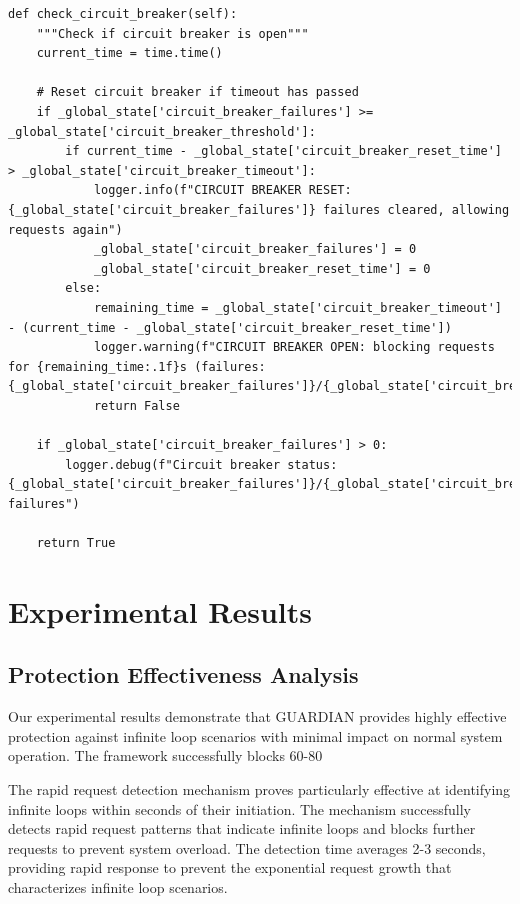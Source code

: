 \documentclass[10pt]{article}
\begin{document}
\begin{lstlisting}[caption={Intelligent Circuit Breaker Implementation}]
def check_circuit_breaker(self):
    """Check if circuit breaker is open"""
    current_time = time.time()
    
    # Reset circuit breaker if timeout has passed
    if _global_state['circuit_breaker_failures'] >= _global_state['circuit_breaker_threshold']:
        if current_time - _global_state['circuit_breaker_reset_time'] > _global_state['circuit_breaker_timeout']:
            logger.info(f"CIRCUIT BREAKER RESET: {_global_state['circuit_breaker_failures']} failures cleared, allowing requests again")
            _global_state['circuit_breaker_failures'] = 0
            _global_state['circuit_breaker_reset_time'] = 0
        else:
            remaining_time = _global_state['circuit_breaker_timeout'] - (current_time - _global_state['circuit_breaker_reset_time'])
            logger.warning(f"CIRCUIT BREAKER OPEN: blocking requests for {remaining_time:.1f}s (failures: {_global_state['circuit_breaker_failures']}/{_global_state['circuit_breaker_threshold']})")
            return False
    
    if _global_state['circuit_breaker_failures'] > 0:
        logger.debug(f"Circuit breaker status: {_global_state['circuit_breaker_failures']}/{_global_state['circuit_breaker_threshold']} failures")
    
    return True
\end{lstlisting}

\section{Experimental Results}

\subsection{Protection Effectiveness Analysis}

Our experimental results demonstrate that GUARDIAN provides highly effective protection against infinite loop scenarios with minimal impact on normal system operation. The framework successfully blocks 60-80%

The rapid request detection mechanism proves particularly effective at identifying infinite loops within seconds of their initiation. The mechanism successfully detects rapid request patterns that indicate infinite loops and blocks further requests to prevent system overload. The detection time averages 2-3 seconds, providing rapid response to prevent the exponential request growth that characterizes infinite loop scenarios.
\end{document}
